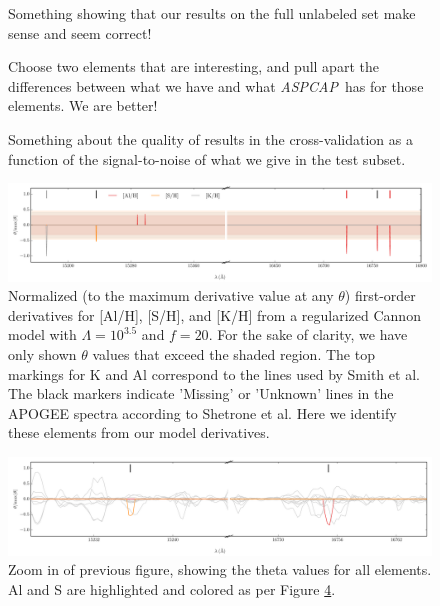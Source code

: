 \documentclass[12pt,preprint]{aastex}
\newcommand{\project}[1]{\textsl{#1}}
\newcommand{\acronym}[1]{{\small{#1}}}
\newcommand{\aspcap}{\project{\acronym{ASPCAP}}}
\begin{document}
\begin{figure}[p]
\caption{Something showing that our results on the full unlabeled set
  make sense and seem correct!\label{fig:fulltest}}
\end{figure}

\begin{figure}[p]
\caption{Choose two elements that are interesting, and pull apart the
  differences between what we have and what \aspcap\ has for those
  elements.  We are better!\label{fig:elements}}
\end{figure}

\begin{figure}[p]
\caption{Something about the quality of results in the
  cross-validation as a function of the signal-to-noise of what we
  give in the test subset.\label{fig:snr}}
\end{figure}


\begin{figure}[p]
\includegraphics[width=\textwidth]{sparse-first-order-coefficients.pdf}
\caption{Normalized (to the maximum derivative value at any $\theta$) first-order derivatives for [Al/H], [S/H], and [K/H] from a regularized Cannon model with $\Lambda = 10^{3.5}$ and $f = 20$. For the sake of clarity, we have only shown $\theta$ values that exceed the shaded region. The top markings for K and Al correspond to the lines used by Smith et al. The black markers indicate 'Missing' or 'Unknown' lines in the APOGEE spectra according to Shetrone et al. Here we identify these elements from our model derivatives.  \label{fig:inferring-lines}}
\end{figure}

\begin{figure}[p]
\includegraphics[width=\textwidth]{sparse-first-order-coefficients-zoom.pdf}
\caption{Zoom in of previous figure, showing the theta values for all elements. Al and S are highlighted and colored as per Figure \ref{fig:inferring-lines}.\label{fig:inferring-lines2}}
\end{figure}
\end{document}
